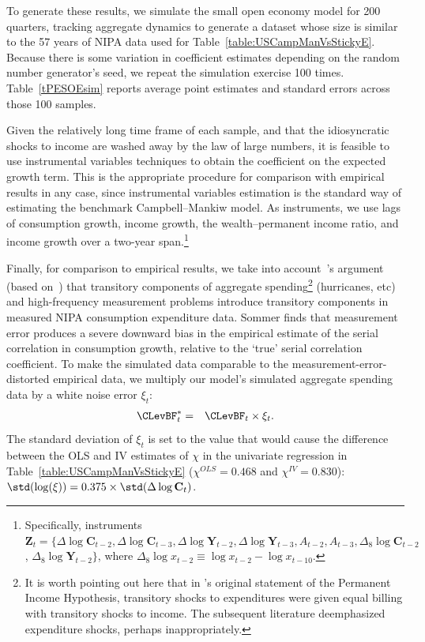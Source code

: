 \documentclass[titlepage]{\econtex}\newcommand{\texname}{cAndCwithStickyE}
\begin{document}
To generate these results, we simulate the small open economy model for 200 quarters, tracking aggregate dynamics to generate a dataset whose size is similar to the 57 years of NIPA data used for Table~\ref{table:USCampManVsStickyE}.  Because there is some variation in coefficient estimates depending on the random number generator's seed, we repeat the simulation exercise 100 times.  Table~\ref{tPESOEsim} reports average point estimates and standard errors across those 100 samples.

Given the relatively long time frame of each sample, and that the idiosyncratic shocks to income are washed away by the law of large numbers, it is feasible to use instrumental variables techniques to obtain the coefficient on the expected growth term.  This is the appropriate procedure for comparison with empirical results in any case, since instrumental variables estimation is the standard way of estimating the benchmark Campbell--Mankiw model.  As instruments, we use lags of consumption growth, income growth, the wealth--permanent income ratio, and income growth over a two-year span.\footnote{Specifically, instruments $\textbf{Z}_t = \{\Delta \log \mathbf{C}_{t-2}, \Delta \log \mathbf{C}_{t-3}, \Delta \log \mathbf{Y}_{t-2}, \Delta \log \mathbf{Y}_{t-3}, A_{t-2}, A_{t-3}, \Delta_8 \log \mathbf{C}_{t-2}$, $\Delta_8 \log \mathbf{Y}_{t-2} \}$, where $\Delta_8 \log x_{t-2}\equiv \log x_{t-2}-\log x_{t-10}$.}

Finally, for comparison to empirical results, we take into account~\cite{som07}'s argument (based on~\cite{wilcox:aer}) that transitory components of aggregate spending\footnote{It is worth pointing out here that in \cite{friedmanATheory}'s original statement of the Permanent Income Hypothesis, transitory shocks to expenditures were given equal billing with transitory shocks to income.  The subsequent literature deemphasized expenditure shocks, perhaps inappropriately.} (hurricanes, etc) and high-frequency measurement problems introduce transitory components in measured NIPA consumption expenditure data.  Sommer finds that measurement error produces a severe downward bias in the empirical estimate of the serial correlation in consumption growth, relative to the `true' serial correlation coefficient.  To make the simulated data comparable to the measurement-error-distorted empirical data, we multiply our model's simulated aggregate spending data by a white noise error $\xi_t$:
 \begin{eqnarray}
{\CLevBF}^*_{t} & = & \CLevBF_{t}\times\xi_{t}.
\end{eqnarray}
The standard deviation of $\xi_t$ is set to the value that would cause the difference between the OLS and IV estimates of $\chi$ in the univariate regression in Table~\ref{table:USCampManVsStickyE} ($\chi^{OLS}=0.468$ and $\chi^{IV}=0.830$): $\std(\log(\xi))= 0.375\times\std(\Delta \log \mathbf{C}_t)$.
\end{document}
